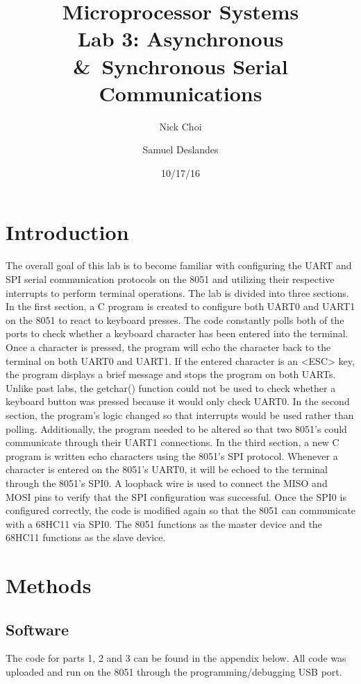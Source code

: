 \documentclass[12pt]{article}
\begin{document}
\title{Microprocessor Systems\\ Lab 3: Asynchronous \&\ Synchronous Serial Communications }
\author{Nick Choi \and Samuel Deslandes}
\date{10/17/16}
\maketitle
\pagebreak
\section{Introduction}

The overall goal of this lab is to become familiar with configuring the UART and SPI serial communication protocols on the 8051 and utilizing their respective interrupts to perform terminal operations. 
The lab is divided into three sections. In the first section, a C program is created to configure both UART0 and UART1 on the 8051 to react to keyboard presses. The code constantly polls both of the ports to check whether a keyboard character has been entered into the terminal. Once a character is pressed, the program will echo the character back to the terminal on both UART0 and UART1. If the entered character is an <ESC> key, the program displays a brief message and stops the program on both UARTs. Unlike past labs, the getchar() function could not be used to check whether a keyboard button was pressed because it would only check UART0. 
In the second section, the program’s logic changed so that interrupts would be used rather than polling. Additionally, the program needed to be altered so that two 8051’s could communicate through their UART1 connections.
In the third section, a new C program is written echo characters using the 8051’s SPI protocol. Whenever a character is entered on the 8051’s UART0, it will be echoed to the terminal through the 8051’s SPI0. A loopback wire is used to connect the MISO and MOSI pins to verify that the SPI configuration was successful. Once the SPI0 is configured correctly, the code is modified again so that the 8051 can communicate with a 68HC11 via SPI0. The 8051 functions as the master device and the 68HC11 functions as the slave device. 
\section{Methods}
\subsection{Software}
The code for parts 1, 2 and 3 can be found in the appendix below. All code was uploaded and run on the 8051 through the programming/debugging USB port. 	
\end{document}
